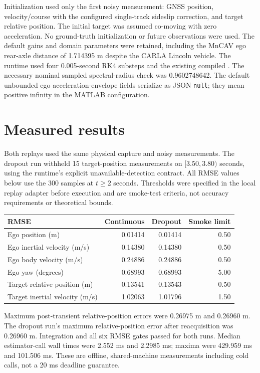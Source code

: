\documentclass[11pt]{article}
\begin{document}
Initialization used only the first noisy measurement: GNSS position,
velocity/course with the configured single-track sideslip correction, and
target relative position. The initial target was assumed co-moving with zero
acceleration. No ground-truth initialization or future observations were used.
The default gains and domain parameters were retained, including the MnCAV
ego rear-axle distance of 1.714395 m despite the CARLA Lincoln vehicle.
The runtime used four 0.005-second RK4 substeps and the existing compiled
.
The necessary nominal sampled spectral-radius check was 0.9602748642.
The default unbounded ego acceleration-envelope fields serialize as JSON
\texttt{null}; they mean positive infinity in the MATLAB configuration.

\section{Measured results}
Both replays used the same physical capture and noisy measurements.
The dropout run withheld 15 target-position measurements on
$[3.50,3.80)$ seconds, using the runtime's explicit unavailable-detection
contract. All RMSE values below use the 300 samples at $t\geq2$ seconds.
Thresholds were specified in the local replay adapter before execution and
are smoke-test criteria, not accuracy requirements or theoretical bounds.

\begin{center}
\begin{tabular}{lrrr}
\toprule
RMSE & Continuous & Dropout & Smoke limit \\
\midrule
Ego position (m) & 0.01414 & 0.01414 & 0.50 \\
Ego inertial velocity (m/s) & 0.14380 & 0.14380 & 0.50 \\
Ego body velocity (m/s) & 0.24886 & 0.24886 & 0.50 \\
Ego yaw (degrees) & 0.68993 & 0.68993 & 5.00 \\
Target relative position (m) & 0.13541 & 0.13543 & 0.50 \\
Target inertial velocity (m/s) & 1.02063 & 1.01796 & 1.50 \\
\bottomrule
\end{tabular}
\end{center}

Maximum post-transient relative-position errors were 0.26975 m and 0.26960 m.
The dropout run's maximum relative-position error after reacquisition was
0.26960 m. Integration and all six RMSE gates passed for both runs.
Median estimator-call wall times were 2.552 ms and 2.2985 ms; maxima were
429.959 ms and 101.506 ms. These are offline, shared-machine measurements
including cold calls, not a 20 ms deadline guarantee.
\end{document}
